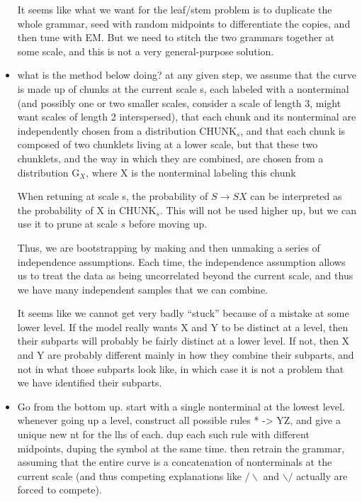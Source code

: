 \documentclass{book}
\begin{document}
\begin{itemize}
    It seems like what we want for the leaf/stem problem is to
    duplicate the whole grammar, seed with random midpoints to
    differentiate the copies, and then tune with EM. But we need to
    stitch the two grammars together at some scale, and this is not a
    very general-purpose solution.
\item what is the method below doing? at any given step, we assume that
    the curve is made up of chunks at the current scale s, each
    labeled with a nonterminal (and possibly one or two smaller
    scales, consider a scale of length 3, might want scales of length
    2 interspersed), that each chunk and its nonterminal are
    independently chosen from a distribution CHUNK$_s$, and that each
    chunk is composed of two chunklets living at a lower scale, but
    that these two chunklets, and the way in which they are combined,
    are chosen from a distribution G$_X$, where X is the nonterminal
    labeling this chunk

    When retuning at scale s, the probability of $S\to SX$ can be
    interpreted as the probability of X in CHUNK$_s$. This will not be
    used higher up, but we can use it to prune at scale $s$ before
    moving up.

    Thus, we are bootstrapping by making and then unmaking a series of
    independence assumptions. Each time, the independence assumption
    allows us to treat the data as being uncorrelated beyond the
    current scale, and thus we have many independent samples that we
    can combine.

    It seems like we cannot get very badly ``stuck'' because of a
    mistake at some lower level. If the model really wants X and Y to
    be distinct at a level, then their subparts will probably be
    fairly distinct at a lower level. If not, then X and Y are
    probably different mainly in how they combine their subparts, and
    not in what those subparts look like, in which case it is not a
    problem that we have identified their subparts.
\item Go from the bottom up. start with a single nonterminal at the
    lowest level. whenever going up a level, construct all possible
    rules * -> YZ, and give a unique new nt for the lhs of each. dup
    each such rule with different midpoints, duping the symbol at the
    same time. then retrain the grammar, assuming that the entire
    curve is a concatenation of nonterminals at the current scale (and
    thus competing explanations like $/\backslash$ and $\backslash/$
    actually are forced to compete).


\end{itemize}
\end{document}
